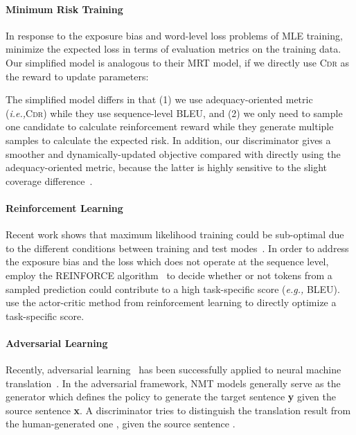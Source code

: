 \documentclass[letterpaper]{article} \usepackage{aaai19}  \usepackage{times}  \usepackage{helvet}  \usepackage{courier}  \usepackage{url}  \usepackage{graphicx}  \frenchspacing  \setlength{\pdfpagewidth}{8.5in}  \setlength{\pdfpageheight}{11in}  \usepackage{amsmath}
\begin{document}
\paragraph{Minimum Risk Training}
In response to the exposure bias and word-level loss problems of MLE training,~\citeauthor{Shen:2016:ACL}~ minimize the expected loss in terms of evaluation metrics on the training data. 
Our simplified model is analogous to their MRT model, if we directly use \textsc{Cdr} as the reward to update parameters:

The simplified model differs in that (1) we use adequacy-oriented metric (\emph{i.e.,}\xspace \textsc{Cdr}) while they use sequence-level BLEU, and (2) we only need to sample one candidate to calculate reinforcement reward while they generate multiple samples to calculate the expected risk.
In addition, our discriminator gives a smoother and dynamically-updated objective compared with directly using the adequacy-oriented metric, because the latter is highly sensitive to the slight coverage difference~\cite{koehn2017six}. 


\paragraph{Reinforcement Learning}
Recent work shows that maximum likelihood training could be sub-optimal due to the different conditions between training and test modes~\cite{bengio2015scheduled,Ranzato:2016:ICLR}. In order to address the exposure bias and the loss which does not operate at the sequence level, \citeauthor{Ranzato:2016:ICLR}~ employ the REINFORCE algorithm~\cite{williams1992simple} to decide whether or not tokens from a sampled prediction could contribute to a high task-specific score (\emph{e.g.,}\xspace BLEU). \citeauthor{bahdanau2016actor}~ use the actor-critic method from reinforcement learning to directly optimize a task-specific score. 




\paragraph{Adversarial Learning}
Recently, adversarial learning~\cite{goodfellow2014generative} has been successfully applied to neural machine translation~\cite{wu2017adversarial,Yang:2018:NAACL,Cheng:2018:ACL}.
In the adversarial framework, NMT models generally serve as the generator which defines the policy to generate the target sentence {\bf y} given the source sentence {\bf x}.
A discriminator tries to distinguish the translation result  from the human-generated one , given the source sentence .
\end{document}
